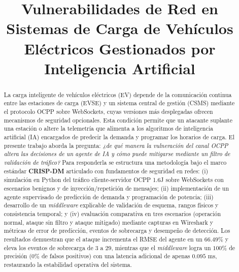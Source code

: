 \documentclass[conference]{IEEEtran}
\begin{document}
\title{Vulnerabilidades de Red en Sistemas de Carga de Vehículos Eléctricos Gestionados por Inteligencia Artificial}

\author{
}

\maketitle

\begin{abstract}
La carga inteligente de vehículos eléctricos (EV) depende de la comunicación continua entre las estaciones de carga (EVSE) y un sistema central de gestión (CSMS) mediante el protocolo OCPP sobre WebSockets, cuyas versiones más desplegadas ofrecen mecanismos de seguridad opcionales. Esta condición permite que un atacante suplante una estación o altere la telemetría que alimenta a los algoritmos de inteligencia artificial (IA) encargados de predecir la demanda y programar los horarios de carga. El presente trabajo aborda la pregunta: \textit{¿de qué manera la vulneración del canal OCPP altera las decisiones de un agente de IA y cómo puede mitigarse mediante un filtro de validación de tráfico?} Para responderla se estructura una metodología bajo el marco estándar \textbf{CRISP-DM} articulado con fundamentos de seguridad en redes: (i) simulación en Python del tráfico cliente-servidor OCPP 1.6J sobre WebSockets con escenarios benignos y de inyección/repetición de mensajes; (ii) implementación de un agente supervisado de predicción de demanda y programación de potencia; (iii) desarrollo de un \textit{middleware} explicable de validación de esquema, rangos físicos y consistencia temporal; y (iv) evaluación comparativa en tres escenarios (operación normal, ataque sin filtro y ataque mitigado) mediante capturas en Wireshark y métricas de error de predicción, eventos de sobrecarga y desempeño de detección. Los resultados demuestran que el ataque incrementa el RMSE del agente en un $66.49\%$ y eleva los eventos de sobrecarga de $3$ a $29$, mientras que el \textit{middleware} logra un $100\%$ de precisión ($0\%$ de falsos positivos) con una latencia adicional de apenas $0.095\text{ ms}$, restaurando la estabilidad operativa del sistema.
\end{abstract}
\end{document}
